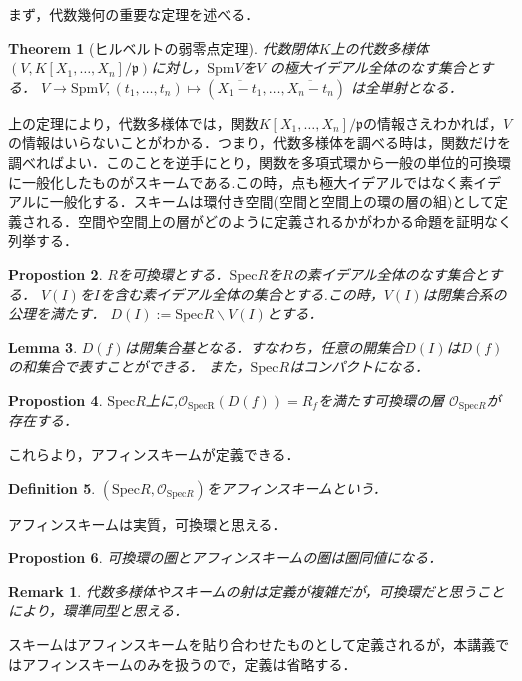 \documentclass{ujarticle}
\newtheorem{thm}{Theorem}[section]
\newtheorem{dfn}[thm]{Definition}
\newtheorem{prop}[thm]{Propostion}
\newtheorem{lem}[thm]{Lemma}
\newtheorem*{rem}{Remark}
\begin{document}
まず，代数幾何の重要な定理を述べる．

\begin{thm}[ヒルベルトの弱零点定理]
代数閉体$K$上の代数多様体$(V,K[X_1,\dots,X_n]/\mathfrak{p})$に対し，$\mathrm{Spm}V$を$V$
の極大イデアル全体のなす集合とする．
$V \to \mathrm{Spm}V,(t_1,\dots,t_n)\mapsto (\overline{X_1 - t_1},\dots,\overline{X_n - t_n})$
は全単射となる．
\end{thm}

上の定理により，代数多様体では，関数$K[X_1,\dots,X_n]/\mathfrak{p}$の情報さえわかれば，$V$の情報はいらないことがわかる．つまり，代数多様体を調べる時は，関数だけを調べればよい．このことを逆手にとり，関数を多項式環から一般の単位的可換環に一般化したものがスキームである.この時，点も極大イデアルではなく素イデアルに一般化する．スキームは環付き空間(空間と空間上の環の層の組)として定義される．空間や空間上の層がどのように定義されるかがわかる命題を証明なく列挙する．

\begin{prop}
$R$を可換環とする．$\mathrm{Spec}R$を$R$の素イデアル全体のなす集合とする．
$V(I)$を$I$を含む素イデアル全体の集合とする.この時，$V(I)$は閉集合系の公理を満たす．
$D(I):=\mathrm{Spec}R \backslash V(I)$とする．
\end{prop}

\begin{lem}
 $D(f)$は開集合基となる．すなわち，任意の開集合$D(I)$は$D(f)$の和集合で表すことができる．
 また，$\mathrm{Spec}R$はコンパクトになる．
\end{lem}

\begin{prop}
 $\mathrm{Spec}R$上に,$\mathcal{O}_{\mathrm{SpecR}}(D(f))=R_f$を満たす可換環の層
 $\mathcal{O}_{\mathrm{Spec}R}$が存在する．
\end{prop}
これらより，アフィンスキームが定義できる．
\begin{dfn}
 $(\mathrm{Spec}R,\mathcal{O}_{\mathrm{Spec}R})$をアフィンスキームという．
\end{dfn}
アフィンスキームは実質，可換環と思える．
\begin{prop}
 可換環の圏とアフィンスキームの圏は圏同値になる．
\end{prop}
\begin{rem}
 代数多様体やスキームの射は定義が複雑だが，可換環だと思うことにより，環準同型と思える．
\end{rem}
スキームはアフィンスキームを貼り合わせたものとして定義されるが，本講義ではアフィンスキームのみを扱うので，定義は省略する．
\end{document}
